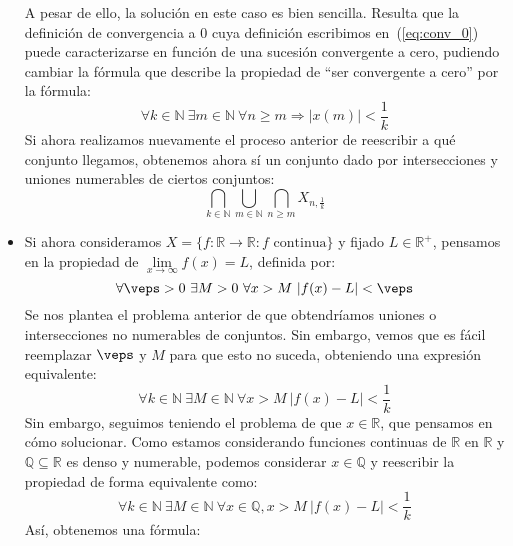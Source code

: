 \begin{ejemplo}
\begin{itemize}
            A pesar de ello, la solución en este caso es bien sencilla. Resulta que la definición de convergencia a 0 cuya definición escribimos en~(\ref{eq:conv_0}) puede caracterizarse en función de una sucesión convergente a cero, pudiendo cambiar la fórmula que describe la propiedad de ``ser convergente a cero'' por la fórmula:
            \begin{equation*}
                \forall k\in \mathbb{N}\ \exists m\in \mathbb{N}\ \forall n\geq m \Longrightarrow |x(m)| < \dfrac{1}{k}
            \end{equation*}
            Si ahora realizamos nuevamente el proceso anterior de reescribir a qué conjunto llegamos, obtenemos ahora sí un conjunto dado por intersecciones y uniones numerables de ciertos conjuntos:
            \begin{equation*}
                \bigcap_{k\in \mathbb{N}} \bigcup_{m\in \mathbb{N}} \bigcap_{n\geq m} X_{n,\frac{1}{k}}
            \end{equation*}
        \item Si ahora consideramos $X = \{f:\mathbb{R}\to\mathbb{R} : f \text{\ continua}\}$ y fijado $L\in \mathbb{R}^+$, pensamos en la propiedad de $\lim\limits_{x\to\infty}f(x) = L$, definida por:
            \begin{equation*}
                \forall \veps > 0\ \exists M>0\ \forall x>M\ |f(x)-L|<\veps
            \end{equation*}
            Se nos plantea el problema anterior de que obtendríamos uniones o intersecciones no numerables de conjuntos. Sin embargo, vemos que es fácil reemplazar $\veps$ y $M$ para que esto no suceda, obteniendo una expresión equivalente:
            \begin{equation*}
                \forall k\in \mathbb{N}\ \exists M\in \mathbb{N}\ \forall x>M\ |f(x)-L|<\dfrac{1}{k}
            \end{equation*}
            Sin embargo, seguimos teniendo el problema de que $x\in \mathbb{R}$, que pensamos en cómo solucionar. Como estamos considerando funciones continuas de $\mathbb{R}$ en $\mathbb{R}$ y $\mathbb{Q}\subseteq \mathbb{R}$ es denso y numerable, podemos considerar $x\in \mathbb{Q}$ y reescribir la propiedad de forma equivalente como:
            \begin{equation*}
                \forall k\in \mathbb{N}\ \exists M\in \mathbb{N}\ \forall x\in \mathbb{Q}, x>M\ |f(x)-L|<\dfrac{1}{k}
            \end{equation*}
            Así, obtenemos una fórmula:

\end{itemize}
\end{ejemplo}
